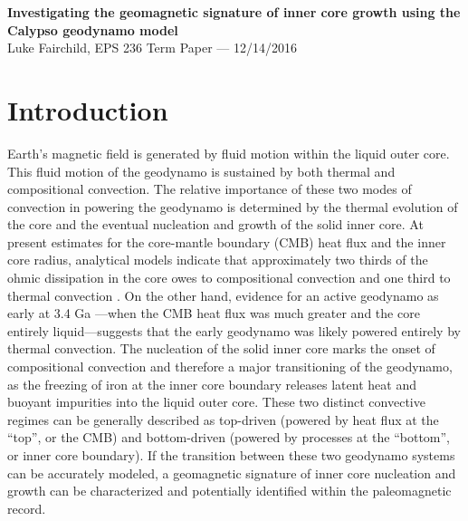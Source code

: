 \documentclass[12pt,letterpaper]{article}
\begin{document}
\begin{flushleft}
{\large \textbf{Investigating the geomagnetic signature of inner core growth using the Calypso geodynamo model}}\\
\vspace{0.3em}
Luke Fairchild, EPS 236 Term Paper --- 12/14/2016
\end{flushleft}

\section*{Introduction}
Earth's magnetic field is generated by fluid motion within the liquid outer core. This fluid motion of the geodynamo is sustained by both thermal and compositional convection. The relative importance of these two modes of convection in powering the geodynamo is determined by the thermal evolution of the core and the eventual nucleation and growth of the solid inner core. At present estimates for the core-mantle boundary (CMB) heat flux and the inner core radius, analytical models indicate that approximately two thirds of the ohmic dissipation in the core owes to compositional convection and one third to thermal convection \citep{Buffett1996a}. On the other hand, evidence for an active geodynamo as early at 3.4 Ga \citep{Tarduno2007a}---when the CMB heat flux was much greater and the core entirely liquid---suggests that the early geodynamo was likely powered entirely by thermal convection. The nucleation of the solid inner core marks the onset of compositional convection and therefore a major transitioning of the geodynamo, as the freezing of iron at the inner core boundary releases latent heat and buoyant impurities into the liquid outer core. These two distinct convective regimes can be generally described as top-driven (powered by heat flux at the ``top'', or the CMB) and bottom-driven (powered by processes at the ``bottom'', or inner core boundary). If the transition between these two geodynamo systems can be accurately modeled, a geomagnetic signature of inner core nucleation and growth can be characterized and potentially identified within the paleomagnetic record.
\end{document}
